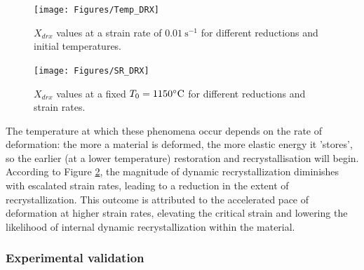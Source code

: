\documentclass[metals,article,submit,pdftex,moreauthors]{Definitions/mdpi}
\DeclareRobustCommand{\ps}{\text{s}^{-1}}
\begin{document}
\begin{figure}[H]
\centering
\texttt{[image: Figures/Temp\_DRX]}
\caption{$X_{drx}$ values at a strain rate of $0.01~\ps$ for different reductions and initial temperatures.}
\label{fig:TempEffect}
\end{figure}
\begin{figure}[H]
\centering
\texttt{[image: Figures/SR\_DRX]}
\caption{$X_{drx}$ values at a fixed $T_0=1150\celsius$ for different reductions and strain rates.}
\label{fig:SREffect}
\end{figure}

The temperature at which these phenomena occur depends on the rate of deformation: the more a material is deformed, the more elastic energy it 'stores', so the earlier (at a lower temperature) restoration and recrystallisation will begin.
According to Figure \ref{fig:SREffect}, the magnitude of dynamic recrystallization diminishes with escalated strain rates, leading to a reduction in the extent of recrystallization.
This outcome is attributed to the accelerated pace of deformation at higher strain rates, elevating the critical strain and lowering the likelihood of internal dynamic recrystallization within the material.

\subsubsection{Experimental validation \label{subsec:ExpValid}}
\end{document}
